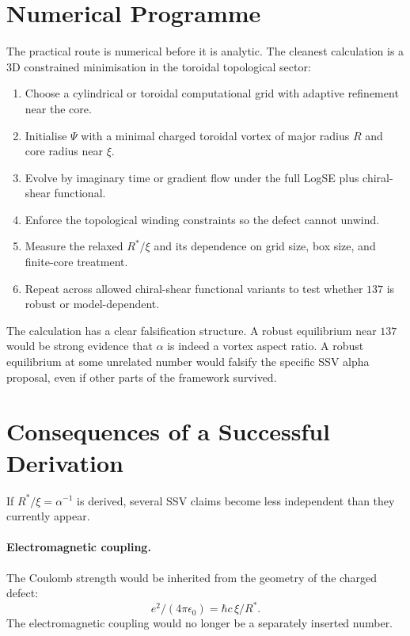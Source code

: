 \documentclass[11pt,a4paper]{article}
\begin{document}
\section{Numerical Programme}
\label{sec:numerics}

The practical route is numerical before it is analytic.  The cleanest
calculation is a 3D constrained minimisation in the toroidal topological
sector:
\begin{enumerate}[label=(N\arabic*)]
    \item Choose a cylindrical or toroidal computational grid with adaptive
          refinement near the core.
    \item Initialise $\Psi$ with a minimal charged toroidal vortex of major
          radius $R$ and core radius near $\xi$.
    \item Evolve by imaginary time or gradient flow under the full
          LogSE plus chiral-shear functional.
    \item Enforce the topological winding constraints so the defect cannot
          unwind.
    \item Measure the relaxed $R^*/\xi$ and its dependence on grid size,
          box size, and finite-core treatment.
    \item Repeat across allowed chiral-shear functional variants to test
          whether $137$ is robust or model-dependent.
\end{enumerate}

The calculation has a clear falsification structure.  A robust equilibrium
near $137$ would be strong evidence that $\alpha$ is indeed a vortex aspect
ratio.  A robust equilibrium at some unrelated number would falsify the
specific SSV alpha proposal, even if other parts of the framework survived.

\section{Consequences of a Successful Derivation}
\label{sec:consequences}

If $R^*/\xi=\alpha^{-1}$ is derived, several SSV claims become less
independent than they currently appear.

\paragraph{Electromagnetic coupling.}
The Coulomb strength would be inherited from the geometry of the charged
defect:
\[
    e^2/(4\pi\epsilon_0)=\hbar c\,\xi/R^*.
\]
The electromagnetic coupling would no longer be a separately inserted
number.
\end{document}
